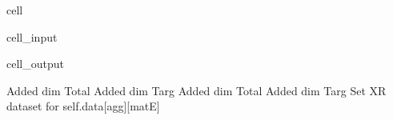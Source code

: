 \documentclass[letterpaper,table,10pt,english]{jupyterBook}
\begin{document}
\begin{sphinxuseclass}{cell}\begin{sphinxVerbatimInput}

\begin{sphinxuseclass}{cell_input}
\begin{sphinxVerbatim}[commandchars=\\\{\}]
         
\end{sphinxVerbatim}

\end{sphinxuseclass}\end{sphinxVerbatimInput}
\begin{sphinxVerbatimOutput}

\begin{sphinxuseclass}{cell_output}
\begin{sphinxVerbatim}[commandchars=\\\{\}]
Added dim Total
Added dim Targ
Added dim Total
Added dim Targ
Set XR dataset for self.data[\PYGZsq{}agg\PYGZsq{}][\PYGZsq{}matE\PYGZsq{}]
\end{sphinxVerbatim}

\end{sphinxuseclass}\end{sphinxVerbatimOutput}

\end{sphinxuseclass}
\end{document}
